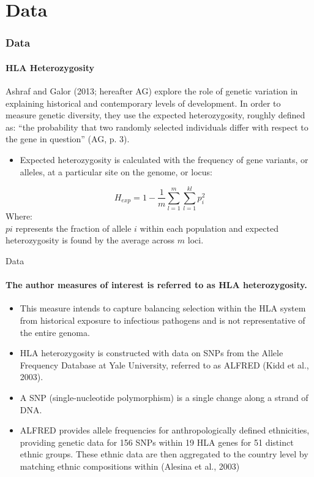 \documentclass[pdftex,12pt,xcolor=pdftex,table]{beamer}
\theoremstyle{definition}
\theoremstyle{remark}
\numberwithin{equation}{section}
\numberwithin{figure}{section}
\begin{document}
\section{Data}
\begin{frame}
\frametitle{Data}
\framesubtitle{HLA Heterozygosity}
\justifying
Ashraf and Galor (2013; hereafter AG)\cite{ashraf2013out} explore the role of genetic variation in explaining historical and contemporary levels of development. In order to measure genetic diversity, they use the expected heterozygosity, roughly defined as: “the probability that two randomly selected individuals differ with respect to the gene in question” (AG, p. 3).
\pause
\begin{itemize}
    \item Expected heterozygosity is calculated with the frequency of gene variants, or alleles, at a particular site on the genome, or locus:
    \pause
\end{itemize}
\begin{equation}
    H_{exp}=1-\frac{1}{m}\sum^{m}_{l=1}\sum^{kl}_{l=1}p_{i}^{2}
\end{equation}
\pause
Where:\\
$pi$ represents the fraction of allele $i$ within each population and expected heterozygosity is found by the average across $m$ loci.
\end{frame}


\begin{frame}{Data}
\framesubtitle{The author measures of interest is referred to as HLA heterozygosity.}
\justifying

\begin{itemize}
\item This measure intends to capture balancing selection within the HLA system from historical exposure to infectious pathogens and is not representative of the entire genoma.
\pause
\item HLA heterozygosity is constructed with data on SNPs from the Allele Frequency Database at Yale University, referred to as ALFRED (Kidd et al., 2003)\cite{kidd2003alfred}.
\pause
\item A SNP (single-nucleotide polymorphism) is a single change along a strand of DNA. 
\pause
\item ALFRED provides allele frequencies for anthropologically defined ethnicities, providing genetic data for 156 SNPs within 19 HLA genes for 51 distinct ethnic groups. These ethnic data are then aggregated to the country level by matching ethnic compositions within (Alesina et al., 2003)\cite{alesina2003fractionalization} 

\end{itemize}
\end{frame}
\end{document}
